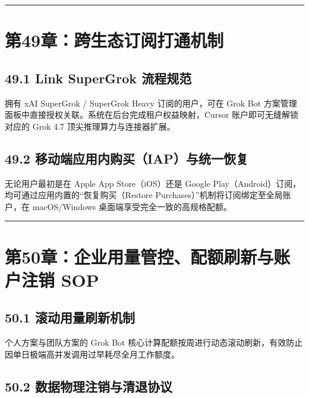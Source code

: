 \documentclass[10.5pt,a4paper,oneside]{report}
\begin{document}
\begin{center}\rule{0.5\linewidth}{0.5pt}\end{center}

\section{第49章：跨生态订阅打通机制}\label{ux7b2c49ux7ae0ux8de8ux751fux6001ux8ba2ux9605ux6253ux901aux673aux5236}

\subsection{49.1 Link SuperGrok
流程规范}\label{link-supergrok-ux6d41ux7a0bux89c4ux8303}

拥有 xAI SuperGrok / SuperGrok Heavy 订阅的用户，可在 Grok Bot
方案管理面板中直接授权关联。系统在后台完成租户权益映射，Cursor
账户即可无缝解锁对应的 Grok 4.7 顶尖推理算力与连接器扩展。

\subsection{49.2
移动端应用内购买（IAP）与统一恢复}\label{ux79fbux52a8ux7aefux5e94ux7528ux5185ux8d2dux4e70iapux4e0eux7edfux4e00ux6062ux590d}

无论用户最初是在 Apple App Store（iOS）还是 Google
Play（Android）订阅，均可通过应用内置的``恢复购买（Restore
Purchases）''机制将订阅绑定至全局账户，在 macOS/Windows
桌面端享受完全一致的高规格配额。

\begin{center}\rule{0.5\linewidth}{0.5pt}\end{center}

\section{第50章：企业用量管控、配额刷新与账户注销
SOP}\label{ux7b2c50ux7ae0ux4f01ux4e1aux7528ux91cfux7ba1ux63a7ux914dux989dux5237ux65b0ux4e0eux8d26ux6237ux6ce8ux9500-sop}

\subsection{50.1
滚动用量刷新机制}\label{ux6edaux52a8ux7528ux91cfux5237ux65b0ux673aux5236}

个人方案与团队方案的 Grok Bot
核心计算配额按周进行动态滚动刷新，有效防止因单日极端高并发调用过早耗尽全月工作额度。

\subsection{50.2
数据物理注销与清退协议}\label{ux6570ux636eux7269ux7406ux6ce8ux9500ux4e0eux6e05ux9000ux534fux8bae}
\end{document}
